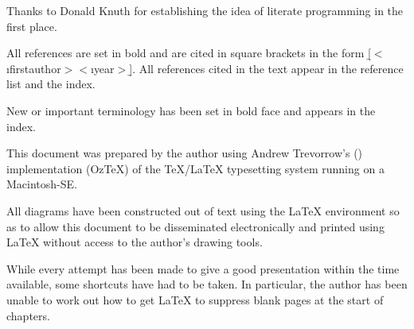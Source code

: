 Thanks to Donald Knuth
for establishing the idea of literate programming in the first place.

\bigskip




 All references are set in bold and are
cited in square brackets in the form
\b{[}$<$\i{firstauthor}$><$\i{year}$>$\b{]}.
All references cited in the text appear in the reference list and the index.

 New or important terminology has been set in bold
face and appears in the index.

 This
document was prepared by the author using Andrew
Trevorrow's ()\checked{}
implementation (OzTeX) of the
\TeX{}/\LaTeX{}
typesetting system running on a Macintosh-SE.

 All diagrams have been constructed out of text using
the \LaTeX{}  environment so as to allow this document to
be disseminated electronically and printed using \LaTeX{} without access
to the author's drawing tools.


 While every attempt has been made
to give a good presentation within the
time available, some shortcuts have had to be taken. In particular, the author
has
been unable to work out how to get \LaTeX{} to suppress blank pages at the
start of chapters.



